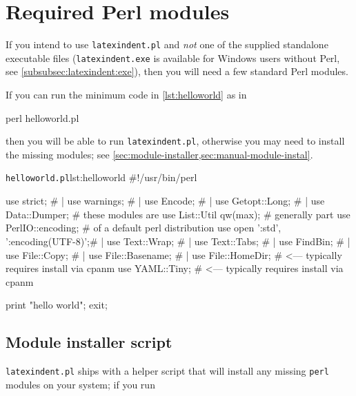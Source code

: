\appendix
 \section{Required Perl modules}\label{sec:requiredmodules}
  If you intend to use \texttt{latexindent.pl} and \emph{not} one of the supplied
  standalone executable files (\texttt{latexindent.exe} is available for Windows users
  without Perl, see \cref{subsubsec:latexindent:exe}), then you will need a few standard
  Perl modules.

  If you can run the minimum code in \cref{lst:helloworld} as in

  \begin{commandshell}
perl helloworld.pl
  \end{commandshell}

  then you will be able to run \texttt{latexindent.pl}, otherwise you may need to install
  the missing modules; see \cref{sec:module-installer,sec:manual-module-instal}.

  \begin{cmhlistings}[style=tcblatex,language=Perl]{\texttt{helloworld.pl}}{lst:helloworld}
#!/usr/bin/perl

use strict;                         #     |
use warnings;                       #     |
use Encode;                         #     |
use Getopt::Long;                   #     |
use Data::Dumper;                   #  these modules are      
use List::Util qw(max);             #  generally part         
use PerlIO::encoding;               #  of a default perl distribution 
use open ':std', ':encoding(UTF-8)';#     |
use Text::Wrap;                     #     |
use Text::Tabs;                     #     |
use FindBin;                        #     |
use File::Copy;                     #     |
use File::Basename;                 #     |
use File::HomeDir;                  # <--- typically requires install via cpanm
use YAML::Tiny;                     # <--- typically requires install via cpanm

print "hello world";
exit;
\end{cmhlistings}

 \subsection{Module installer script}\label{sec:module-installer}
   \texttt{latexindent.pl} ships with a
  helper script that will install any missing \texttt{perl} modules on your system; if you
  run

